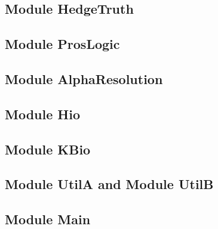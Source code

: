 \documentclass[../gr-final.tex]{subfiles}
\begin{document}
\subsection{Module HedgeTruth}
\subsection{Module ProsLogic}
\subsection{Module AlphaResolution}
\subsection{Module Hio}
\subsection{Module KBio}
\subsection{Module UtilA and Module UtilB}
\subsection{Module Main}
\end{document}
